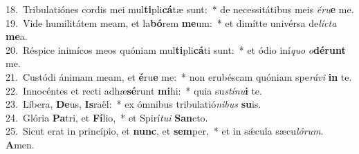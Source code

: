 {18.~}Tribulatiónes cordis mei mul\textbf{ti}pli\textbf{cá}tæ sunt:~* de necessitátibus meis \textit{é}\textit{ru}\textbf{e} me.\\
{19.~}Vide humilitátem meam, et la\textbf{bó}rem \textbf{me}um:~* et dimítte univérsa de\textit{lí}\textit{cta} \textbf{me}a.\\
{20.~}Réspice inimícos meos quóniam mul\textbf{ti}pli\textbf{cá}ti sunt:~* et ódio iní\textit{quo} \textit{o}\textbf{dé}\textbf{runt} me.\\
{21.~}Custódi ánimam meam, et \textbf{é}ru\textbf{e} me:~* non erubéscam quóniam spe\textit{rá}\textit{vi} \textbf{in} te.\\
{22.~}Innocéntes et recti adhæ\textbf{sé}runt \textbf{mi}hi:~* quia su\textit{stí}\textit{nu}\textbf{i} te.\\
{23.~}Líbera, \textbf{De}us, \textbf{Is}raël:~* ex ómnibus tribulatió\textit{ni}\textit{bus} \textbf{su}is.\\
{24.~}Glória \textbf{Pa}tri, et \textbf{Fí}lio,~* et Spirí\textit{tu}\textit{i} \textbf{San}cto.\\
{25.~}Sicut erat in princípio, et \textbf{nunc}, et \textbf{sem}per,~* et in sǽcula sæcu\textit{ló}\textit{rum}. \textbf{A}men.\\
